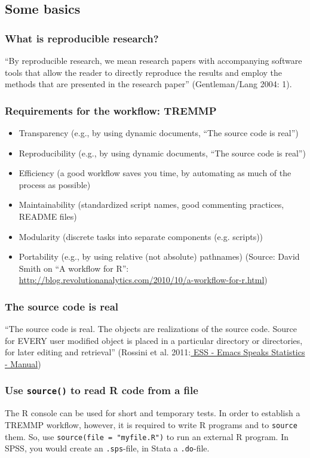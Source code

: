 \documentclass[bigger]{beamer}
\begin{document}
\subsection{Some basics}
\label{sec-9-1}
\begin{frame}
\frametitle{What is reproducible research?}
\label{sec-9-1-1}


    \enquote{By reproducible research, we mean research papers with accompanying software tools that allow the
    reader to directly reproduce the results and employ the methods that are presented in the research
    paper} (Gentleman/Lang 2004: 1). 
\end{frame}
\begin{frame}
\frametitle{Requirements for the workflow: TREMMP}
\label{sec-9-1-2}

    \small
\begin{itemize}
\item Transparency (e.g., by using dynamic documents, \enquote{The source code is real})
\item Reproducibility (e.g., by using dynamic documents, \enquote{The source code is real})
\item Efficiency (a good workflow saves you time, by automating as much of the process as possible)
\item Maintainability (standardized script names, good commenting practices, README files)
\item Modularity (discrete tasks into separate components (e.g. scripts))
\item Portability (e.g., by using relative (not absolute) pathnames)
      \vfill
      \tiny
      (Source: David Smith on \enquote{A workflow for R}: \href{http://blog.revolutionanalytics.com/2010/10/a-workflow-for-r.html}{http://blog.revolutionanalytics.com/2010/10/a-workflow-for-r.html})
\end{itemize}
\end{frame}
\begin{frame}
\frametitle{The source code is real}
\label{sec-9-1-3}

    \enquote{The source code is real. The objects are realizations of the source code. Source for EVERY user
    modified object is placed in a particular directory or directories, for later editing and retrieval}
    (Rossini et al. 2011:\href{http://ess.r-project.org/Manual/ess.html}{ ESS - Emacs Speaks Statistics - Manual})
\end{frame}
\begin{frame}
\frametitle{Use \texttt{source()} to read R code from a file}
\label{sec-9-1-4}

    The R console can be used for short and temporary tests. In order to
    establish a TREMMP workflow, however, it is required to write R programs and
    to \texttt{source} them. So, use \texttt{source(file = "myfile.R")} to run an external R
    program. In SPSS, you would create an \texttt{.sps}-file, in Stata a \texttt{.do}-file.
\end{frame}
\end{document}
